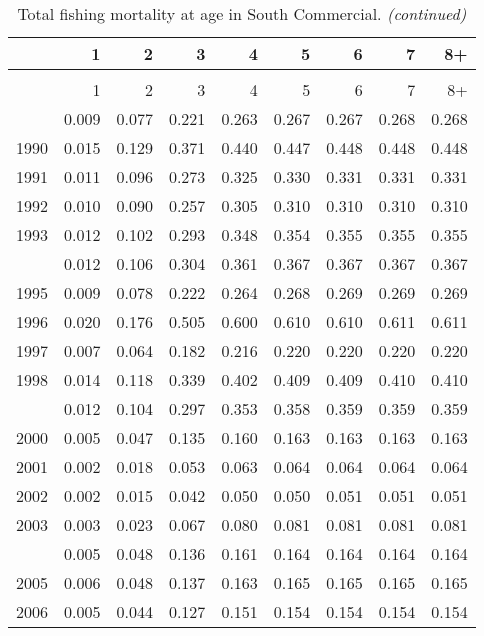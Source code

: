 \documentclass[
]{article}
\begin{document}
\begin{longtable}[t]{lrrrrrrrr}
\caption{\label{tab:South_Commercial-fleet-FAA-table}Total fishing mortality at age in South Commercial.}\\
\toprule
  & 1 & 2 & 3 & 4 & 5 & 6 & 7 & 8+\\
\midrule
\endfirsthead
\caption[]{Total fishing mortality at age in South Commercial. \textit{(continued)}}\\
\toprule
  & 1 & 2 & 3 & 4 & 5 & 6 & 7 & 8+\\
\midrule
\endhead

\endfoot
\bottomrule
\endlastfoot
1989 & 0.009 & 0.077 & 0.221 & 0.263 & 0.267 & 0.267 & 0.268 & 0.268\\
1990 & 0.015 & 0.129 & 0.371 & 0.440 & 0.447 & 0.448 & 0.448 & 0.448\\
1991 & 0.011 & 0.096 & 0.273 & 0.325 & 0.330 & 0.331 & 0.331 & 0.331\\
1992 & 0.010 & 0.090 & 0.257 & 0.305 & 0.310 & 0.310 & 0.310 & 0.310\\
1993 & 0.012 & 0.102 & 0.293 & 0.348 & 0.354 & 0.355 & 0.355 & 0.355\\
\addlinespace
1994 & 0.012 & 0.106 & 0.304 & 0.361 & 0.367 & 0.367 & 0.367 & 0.367\\
1995 & 0.009 & 0.078 & 0.222 & 0.264 & 0.268 & 0.269 & 0.269 & 0.269\\
1996 & 0.020 & 0.176 & 0.505 & 0.600 & 0.610 & 0.610 & 0.611 & 0.611\\
1997 & 0.007 & 0.064 & 0.182 & 0.216 & 0.220 & 0.220 & 0.220 & 0.220\\
1998 & 0.014 & 0.118 & 0.339 & 0.402 & 0.409 & 0.409 & 0.410 & 0.410\\
\addlinespace
1999 & 0.012 & 0.104 & 0.297 & 0.353 & 0.358 & 0.359 & 0.359 & 0.359\\
2000 & 0.005 & 0.047 & 0.135 & 0.160 & 0.163 & 0.163 & 0.163 & 0.163\\
2001 & 0.002 & 0.018 & 0.053 & 0.063 & 0.064 & 0.064 & 0.064 & 0.064\\
2002 & 0.002 & 0.015 & 0.042 & 0.050 & 0.050 & 0.051 & 0.051 & 0.051\\
2003 & 0.003 & 0.023 & 0.067 & 0.080 & 0.081 & 0.081 & 0.081 & 0.081\\
\addlinespace
2004 & 0.005 & 0.048 & 0.136 & 0.161 & 0.164 & 0.164 & 0.164 & 0.164\\
2005 & 0.006 & 0.048 & 0.137 & 0.163 & 0.165 & 0.165 & 0.165 & 0.165\\
2006 & 0.005 & 0.044 & 0.127 & 0.151 & 0.154 & 0.154 & 0.154 & 0.154\\

\end{longtable}
\end{document}
